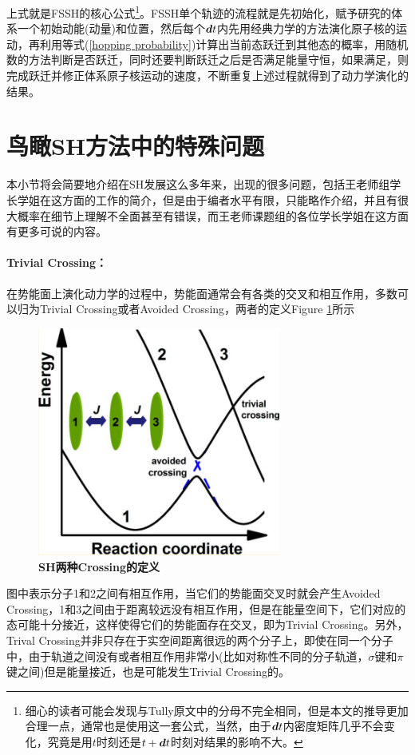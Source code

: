 \documentclass[12pt,a4paper,openany,twoside]{book}
\numberwithin{equation}{section}
\begin{document}
        上式就是FSSH的核心公式\footnote{细心的读者可能会发现与Tully原文中的分母不完全相同，但是本文的推导更加合理一点，通常也是使用这一套公式，当然，由于$\vb*{d}t$内密度矩阵几乎不会变化，究竟是用$t$时刻还是$t+\vb*{d}t$时刻对结果的影响不大。}。FSSH单个轨迹的流程就是先初始化，赋予研究的体系一个初始动能(动量)和位置，然后每个$\vb*{d}t$内先用经典力学的方法演化原子核的运动，再利用等式(\ref{hopping probability})计算出当前态跃迁到其他态的概率，用随机数的方法判断是否跃迁，同时还要判断跃迁之后是否满足能量守恒，如果满足，则完成跃迁并修正体系原子核运动的速度，不断重复上述过程就得到了动力学演化的结果。
        
      \section{鸟瞰SH方法中的特殊问题}
        本小节将会简要地介绍在SH发展这么多年来，出现的很多问题，包括王老师组学长学姐在这方面的工作的简介，但是由于编者水平有限，只能略作介绍，并且有很大概率在细节上理解不全面甚至有错误，而王老师课题组的各位学长学姐在这方面有更多可说的内容。

        \paragraph{Trivial Crossing：}在势能面上演化动力学的过程中，势能面通常会有各类的交叉和相互作用，多数可以归为Trivial Crossing或者Avoided Crossing，两者的定义Figure \ref{two kinds of crossing}所示
        \begin{figure}
          \centering
          \label{two kinds of crossing}
          \includegraphics[width = 8cm]{fig/crossing.jpg}
          \caption{\textbf{SH两种Crossing的定义}}
        \end{figure}
        图中表示分子1和2之间有相互作用，当它们的势能面交叉时就会产生Avoided Crossing，1和3之间由于距离较远没有相互作用，但是在能量空间下，它们对应的态可能十分接近，这样使得它们的势能面存在交叉，即为Trivial Crossing。另外，Trival Crossing并非只存在于实空间距离很远的两个分子上，即使在同一个分子中，由于轨道之间没有或者相互作用非常小(比如对称性不同的分子轨道，$\sigma$键和$\pi$键之间)但是能量接近，也是可能发生Trivial Crossing的。
\end{document}
